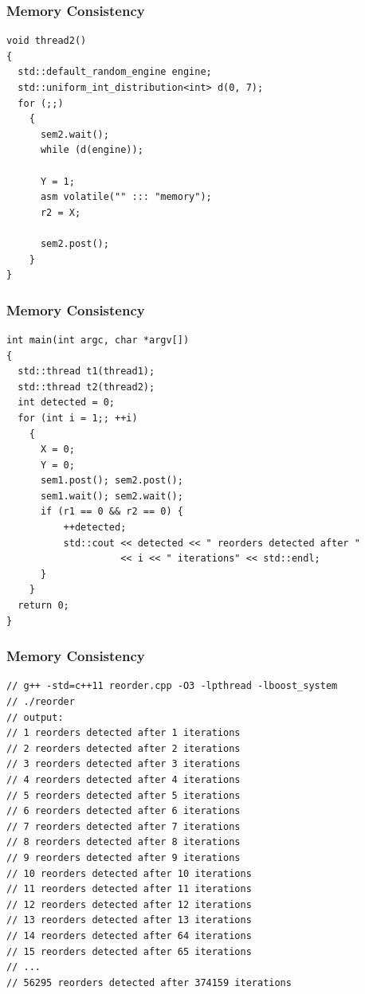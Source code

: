 \documentclass{beamer}
\begin{document}
\begin{frame}[fragile]
\frametitle{Memory Consistency}
\scriptsize
\begin{lstlisting}[linebackgroundcolor={\lstcolorlines{10,11,12}}]
void thread2()
{
  std::default_random_engine engine;
  std::uniform_int_distribution<int> d(0, 7);
  for (;;)
    {
      sem2.wait();
      while (d(engine));

      Y = 1;
      asm volatile("" ::: "memory");
      r2 = X;

      sem2.post();
    }
}
\end{lstlisting}

\end{frame}

\begin{frame}[fragile]
\frametitle{Memory Consistency}
\scriptsize
\begin{lstlisting}[linebackgroundcolor={\lstcolorlines{8,9,12,13}}]
int main(int argc, char *argv[])
{
  std::thread t1(thread1);
  std::thread t2(thread2);
  int detected = 0;
  for (int i = 1;; ++i)
    {
      X = 0;
      Y = 0;
      sem1.post(); sem2.post();
      sem1.wait(); sem2.wait();
      if (r1 == 0 && r2 == 0) {
          ++detected;
          std::cout << detected << " reorders detected after "
                    << i << " iterations" << std::endl;
      }
    }
  return 0;
}
\end{lstlisting}

\end{frame}

\begin{frame}[fragile]
\frametitle{Memory Consistency}
\scriptsize
\begin{lstlisting}
// g++ -std=c++11 reorder.cpp -O3 -lpthread -lboost_system
// ./reorder
// output:
// 1 reorders detected after 1 iterations
// 2 reorders detected after 2 iterations
// 3 reorders detected after 3 iterations
// 4 reorders detected after 4 iterations
// 5 reorders detected after 5 iterations
// 6 reorders detected after 6 iterations
// 7 reorders detected after 7 iterations
// 8 reorders detected after 8 iterations
// 9 reorders detected after 9 iterations
// 10 reorders detected after 10 iterations
// 11 reorders detected after 11 iterations
// 12 reorders detected after 12 iterations
// 13 reorders detected after 13 iterations
// 14 reorders detected after 64 iterations
// 15 reorders detected after 65 iterations
// ...
// 56295 reorders detected after 374159 iterations
\end{lstlisting}

\end{frame}
\end{document}
